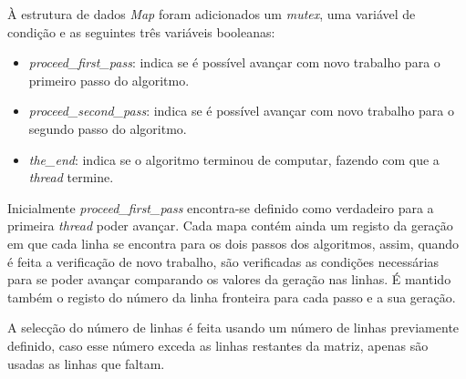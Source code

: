 \documentclass[12pt]{article}
\begin{document}
À estrutura de dados \textit{Map} foram adicionados um \textit{mutex}, uma variável de condição
e as seguintes três variáveis booleanas:

\begin{itemize}
  \item \textit{proceed\_first\_pass}: indica se é possível avançar com novo trabalho
  para o primeiro passo do algoritmo.
  \item \textit{proceed\_second\_pass}: indica se é possível avançar com novo trabalho
  para o segundo passo do algoritmo.
  \item \textit{the\_end}: indica se o algoritmo terminou de computar, fazendo com que a \textit{thread} termine.
\end{itemize}

Inicialmente \textit{proceed\_first\_pass} encontra-se definido como verdadeiro para a primeira \textit{thread}
poder avançar. Cada mapa contém ainda um registo da geração em que cada linha se encontra para os dois passos
dos algoritmos, assim, quando é feita a verificação de novo trabalho, são verificadas as condições necessárias
para se poder avançar comparando os valores da geração nas linhas. É mantido também o registo
do número da linha fronteira para cada passo e a sua geração.

A selecção do número de linhas é feita usando um número de linhas previamente definido, caso
esse número exceda as linhas restantes da matriz, apenas são usadas as linhas que faltam.
\end{document}
